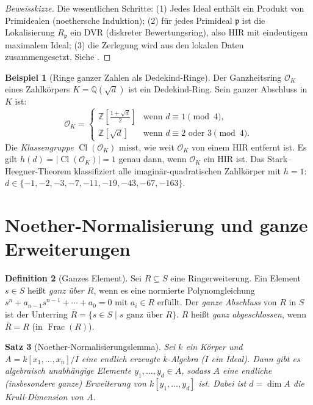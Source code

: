 \documentclass[12pt,a4paper]{amsart}
\newtheorem{theorem}{Satz}[section]
\theoremstyle{definition}
\newtheorem{definition}[theorem]{Definition}
\newtheorem{example}[theorem]{Beispiel}
\theoremstyle{definition}
\DeclareMathOperator{\Frac}{Frac}
\DeclareMathOperator{\Cl}{Cl}
\begin{document}
\begin{proof}[Beweissk{}izze]
Die wesentlichen Schritte: (1) Jedes Ideal enthält ein Produkt von Primidealen
(noethersche Induktion); (2) für jedes Primideal $\mathfrak{p}$ ist die Lokalisierung
$R_\mathfrak{p}$ ein DVR (diskreter Bewertungsring), also HIR mit eindeutigem maximalem
Ideal; (3) die Zerlegung wird aus den lokalen Daten zusammengesetzt. Siehe \cite{Neukirch1999}.
\end{proof}

\begin{example}[Ringe ganzer Zahlen als Dedekind-Ringe]
Der Ganzheitsring $\mathcal{O}_K$ eines Zahlkörpers $K = \mathbb{Q}(\sqrt{d})$ ist
ein Dedekind-Ring. Sein ganzer Abschluss in $K$ ist:
\[
  \mathcal{O}_K = \begin{cases}
    \mathbb{Z}\!\left[\tfrac{1+\sqrt{d}}{2}\right] & \text{wenn } d \equiv 1 \pmod 4, \\
    \mathbb{Z}[\sqrt{d}] & \text{wenn } d \equiv 2 \text{ oder } 3 \pmod 4.
  \end{cases}
\]
Die \emph{Klassengruppe} $\Cl(\mathcal{O}_K)$ misst, wie weit $\mathcal{O}_K$
von einem HIR entfernt ist. Es gilt $h(d) = |\Cl(\mathcal{O}_K)| = 1$ genau dann,
wenn $\mathcal{O}_K$ ein HIR ist.
Das Stark--Heegner-Theorem klassifiziert alle imaginär-quadratischen Zahlkörper mit
$h = 1$: $d \in \{-1, -2, -3, -7, -11, -19, -43, -67, -163\}$.
\end{example}

\section{Noether-Normalisierung und ganze Erweiterungen}

\begin{definition}[Ganzes Element]
Sei $R \subseteq S$ eine Ringerweiterung. Ein Element $s \in S$ heißt \emph{ganz
über $R$}, wenn es eine normierte Polynomgleichung $s^n + a_{n-1}s^{n-1} + \cdots +
a_0 = 0$ mit $a_i \in R$ erfüllt. Der \emph{ganze Abschluss} von $R$ in $S$ ist der
Unterring $\bar{R} = \{s \in S \mid s \text{ ganz über } R\}$.
$R$ heißt \emph{ganz abgeschlossen}, wenn $\bar{R} = R$ (in $\Frac(R)$).
\end{definition}

\begin{theorem}[Noether-Normalisierungslemma]
Sei $k$ ein Körper und $A = k[x_1,\ldots,x_n]/I$ eine endlich erzeugte $k$-Algebra
($I$ ein Ideal). Dann gibt es algebraisch unabhängige Elemente $y_1,\ldots,y_d \in A$,
sodass $A$ eine endliche (insbesondere ganze) Erweiterung von $k[y_1,\ldots,y_d]$ ist.
Dabei ist $d = \dim A$ die Krull-Dimension von $A$.
\end{theorem}
\end{document}
